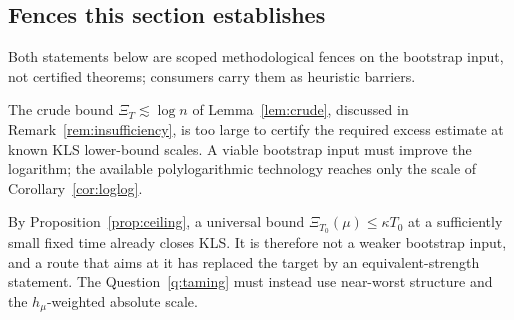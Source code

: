 \documentclass[../../main.tex]{subfiles}
\begin{document}
\subsection{Fences this section establishes}
\label{subsec:bootstrap-fences}

Both statements below are scoped methodological fences on the bootstrap input, not certified
theorems; consumers carry them as heuristic barriers.

\begin{obstruction}
\label{obs:crude-insufficient}
The crude bound \(\Xi_T\lesssim\log n\) of Lemma~\ref{lem:crude}, discussed in
Remark~\ref{rem:insufficiency}, is too large to certify the required excess estimate at known KLS
lower-bound scales. A viable bootstrap input must improve the logarithm; the available
polylogarithmic technology reaches only the scale of Corollary~\ref{cor:loglog}.
\end{obstruction}

\begin{obstruction}
\label{obs:relative-ceiling}
By Proposition~\ref{prop:ceiling}, a universal bound \(\Xi_{T_0}(\mu)\le\kappa T_0\) at a
sufficiently small fixed time already closes KLS. It is therefore not a weaker bootstrap input,
and a route that aims at it has replaced the target by an equivalent-strength statement. The
Question~\ref{q:taming} must instead use near-worst structure and the \(h_\mu\)-weighted absolute
scale.
\end{obstruction}
\end{document}
